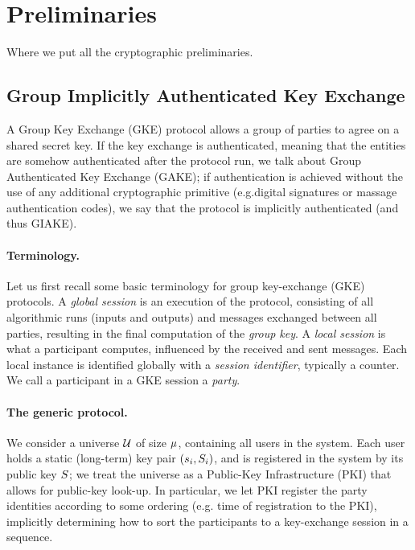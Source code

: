 \section{Preliminaries}\label{sec:preliminaries}
Where we put all the cryptographic preliminaries.

\subsection{Group Implicitly Authenticated Key Exchange}\label{subsec:GIAKE}
A Group Key Exchange (GKE) protocol allows a group of parties to agree on a shared secret key. 
If the key exchange is authenticated, meaning that the entities are somehow authenticated after the protocol run, we talk about Group Authenticated Key Exchange (GAKE); if authentication is achieved without the use of any additional cryptographic primitive (e.g.digital signatures or massage authentication codes), we say that the protocol is implicitly authenticated (and thus GIAKE).

\paragraph{Terminology.} Let us first recall some basic terminology for group key-exchange (GKE) protocols.
A \textit{global session} is an execution of the protocol, consisting of all algorithmic runs (inputs and outputs) and messages exchanged between all parties, resulting in the final computation of the \textit{group key}.
A \textit{local session} is what a participant computes, influenced by the received and sent messages.
Each local instance is identified globally with a \textit{session identifier}, typically a counter.
We call a participant in a GKE session a \textit{party}.

\paragraph{The generic protocol.} We consider a universe $\mathcal{U}$ of size $\mu$, containing all users in the system.
Each user holds a static (long-term) key pair $(s_i,S_i)$, and is registered in the system by its public key $S$; we treat the universe as a Public-Key Infrastructure (PKI) that allows for public-key look-up.
In particular, we let PKI register the party identities according to some ordering (e.g. time of registration to the PKI), implicitly determining how to sort the participants to a key-exchange session in a sequence.

